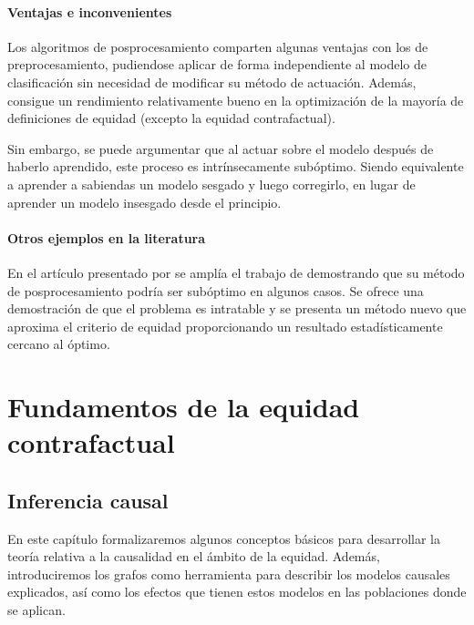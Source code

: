 \documentclass[oneside,openright,titlepage,numbers=noenddot,openany,headinclude,footinclude=true,
cleardoublepage=empty,abstractoff,BCOR=5mm,paper=a4,fontsize=12pt,main=spanish]{scrreprt}
\begin{document}
\subsection*{Ventajas e inconvenientes}

Los algoritmos de posprocesamiento comparten algunas ventajas con los de preprocesamiento, pudiendose aplicar de forma independiente al modelo de clasificación sin necesidad de modificar su método de actuación. Además, consigue un rendimiento relativamente bueno en la optimización de la mayoría de definiciones de equidad (excepto la  equidad contrafactual).

Sin embargo, se puede argumentar que al actuar sobre el modelo después de haberlo aprendido, este proceso es intrínsecamente subóptimo. Siendo equivalente a aprender a sabiendas un modelo sesgado y luego corregirlo, en lugar de aprender un modelo insesgado desde el principio.

\subsection*{Otros ejemplos en la literatura}

En el artículo presentado por \cite{woodworth2017} se amplía el trabajo de \cite{eodd2016} demostrando que su método de posprocesamiento podría ser subóptimo en algunos casos. Se ofrece una demostración de que el problema es intratable y se presenta un método nuevo que aproxima el criterio de equidad proporcionando un resultado estadísticamente cercano al óptimo.

\part{Fundamentos de la equidad contrafactual} \label{part:fundamentoseqcontra}

\chapter{Inferencia causal} \label{ch:inferenciacau}

En este capítulo formalizaremos algunos conceptos básicos para desarrollar la teoría relativa a la causalidad en el ámbito de la equidad. Además, introduciremos los grafos como herramienta para describir los modelos causales explicados, así como los efectos que tienen estos modelos en las poblaciones donde se aplican.
\end{document}
